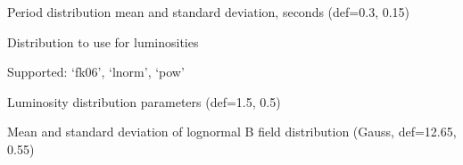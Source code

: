 \documentclass[letterpaper,10pt,english]{sphinxmanual}
\begin{document}
\begin{fulllineitems}
\label{\detokenize{cmd-line-docs:cmdoption-evolve.py-p}}
\pysigstartsignatures
\pysigline
{}
\pysigstopsignatures
\sphinxAtStartPar
Period distribution mean and standard deviation, seconds (def=0.3, 0.15)

\end{fulllineitems}


\begin{fulllineitems}
\label{\detokenize{cmd-line-docs:cmdoption-evolve.py-ldist}}
\pysigstartsignatures
\pysigline
{}
\pysigstopsignatures
\sphinxAtStartPar
Distribution to use for luminosities

\sphinxAtStartPar
Supported: ‘fk06’, ‘lnorm’, ‘pow’

\end{fulllineitems}


\begin{fulllineitems}
\label{\detokenize{cmd-line-docs:cmdoption-evolve.py-l}}
\pysigstartsignatures
\pysigline
{}
\pysigstopsignatures
\sphinxAtStartPar
Luminosity distribution parameters (def=\sphinxhyphen{}1.5, 0.5)

\end{fulllineitems}


\begin{fulllineitems}
\label{\detokenize{cmd-line-docs:cmdoption-evolve.py-b}}
\pysigstartsignatures
\pysigline
{}
\pysigstopsignatures
\sphinxAtStartPar
Mean and standard deviation of log\sphinxhyphen{}normal B field distribution (Gauss, def=12.65, 0.55)

\end{fulllineitems}
\end{document}
